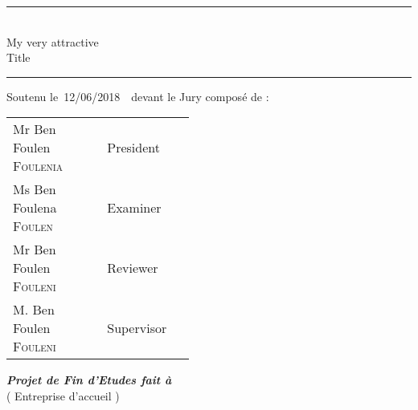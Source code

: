 \documentclass[a4paper, oneside, french, 12pt, final]{extreport}
\newcommand{\reportSubject} {%
  My very attractive \\ Title%
}
\newcommand{\dateSoutenance} {%
  12/06/2018%
}
\newcommand{\studyDepartment} {%
  Entreprise d'accueil %
}
\newcommand{\juryPresident} {%
  Mr Ben Foulen \textsc{Foulenia}%
}
\newcommand{\juryPresidentDesc} {%
  President%
}
\newcommand{\juryMemberOne} {%
  Ms Ben Foulena \textsc{Foulen}%
}
\newcommand{\juryMemberOneDesc} {%
  Examiner %
}
\newcommand{\juryMemberTwo} {%
  Mr Ben Foulen \textsc{Fouleni}%
}
\newcommand{\juryMemberTwoDesc} {%
  Reviewer%
}
\newcommand{\juryMemberThree} {%
	M. Ben Foulen \textsc{Fouleni}%
}
\newcommand{\juryMemberThreeDesc} {%
	Supervisor%
}
\newcommand{\juryMemberFour} {%
	M. Ben Foulen \textsc{Fouleni}%
}
\newcommand{\juryMemberFourDesc} {%
	Mentor%
}
\begin{document}
\begin{titlepage}
\begin{center}
\vspace{5pt} {%
  \renewcommand*{\familydefault}{\defaultFont}
  \fontsize{27pt}{27pt}\selectfont%
  \rule{0.5\textwidth}{.4pt}\\
  \vspace{10pt}
  \reportSubject{}\\%
  \vspace{10pt}
  \rule{0.5\textwidth}{.4pt}
}

\vspace{5pt}
Soutenu le\, \dateSoutenance\,\, devant le Jury compos\'e de :\\
\vspace{10pt}
\begin{tabular}{p{0.3\linewidth} p{0.15\linewidth}}
  \juryPresident{} & \juryPresidentDesc{}\\
  \juryMemberOne{} & \juryMemberOneDesc{}\\
  \juryMemberTwo{} & \juryMemberTwoDesc{}\\
  \juryMemberThree{} & \juryMemberThreeDesc{}\\
\end{tabular}


\vspace{10pt}%
\textbf{\textit{Projet de Fin d'Etudes fait \`a}}\\
\vspace{5pt}
(\studyDepartment)\\
\end{center}
\end{titlepage}

%
\end{document}
